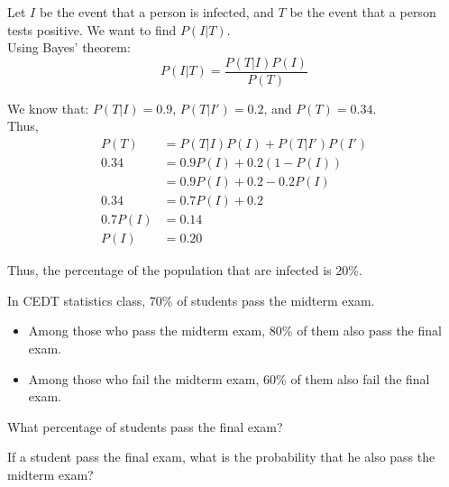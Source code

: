 \documentclass[a4paper, 10pt]{article}
\begin{document}
\begin{solution}
Let \( I \) be the event that a person is infected, and \( T \) be the event that a person tests positive.
We want to find \( P(I | T) \). \\

Using Bayes' theorem:
\[
P(I | T) = \frac{P(T | I) P(I)}{P(T)}
\]

We know that: \( P(T | I) = 0.9 \), \( P(T | I') = 0.2 \), and \( P(T) = 0.34 \). \\
Thus,
\begin{align*}
    P(T) &= P(T | I) P(I) + P(T | I') P(I') \\
    0.34 &= 0.9P(I) + 0.2(1 - P(I)) \\
    &= 0.9P(I) + 0.2 - 0.2P(I) \\
    0.34 &= 0.7P(I) + 0.2 \\
    0.7P(I) &= 0.14 \\
    P(I) &= 0.20
\end{align*}

Thus, the percentage of the population that are infected is \( \boxed{20\%} \).
\end{solution}


\begin{problem}
In CEDT statistics class, 70\% of students pass the midterm exam.
\begin{itemize}[wide=0pt, itemsep=2pt, parsep=0pt, leftmargin=*]
    \item Among those who pass the midterm exam, 80\% of them also pass the final exam.
    \item Among those who fail the midterm exam, 60\% of them also fail the final exam.
\end{itemize}
\begin{subproblems}
    \item What percentage of students pass the final exam?
    \item If a student pass the final exam, what is the probability that he also pass the midterm exam?
\end{subproblems}
\end{problem}
\end{document}
